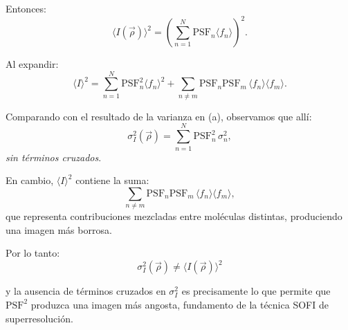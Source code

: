\documentclass[11pt]{article}
\begin{document}
Entonces:
\[
\langle I(\vec{\rho}) \rangle^2
= \left(
\sum_{n=1}^{N}
\text{PSF}_n \langle f_n \rangle
\right)^2.
\]

Al expandir:
\[
\langle I \rangle^2
=
\sum_{n=1}^{N}
\text{PSF}_n^2 \langle f_n \rangle^2
+ \sum_{n \neq m}
\text{PSF}_n \text{PSF}_m\,
\langle f_n \rangle \langle f_m \rangle.
\]

Comparando con el resultado de la varianza en (a), observamos que allí:
\[
\sigma_I^2(\vec{\rho})
= \sum_{n=1}^{N}
\text{PSF}_n^2\,\sigma_n^2,
\]
\emph{sin términos cruzados}.  

En cambio, $\langle I \rangle^2$ contiene la suma:
\[
\sum_{n \neq m}
\text{PSF}_n \text{PSF}_m\,
\langle f_n \rangle \langle f_m \rangle,
\]
que representa contribuciones mezcladas entre moléculas distintas, produciendo una imagen más borrosa.

Por lo tanto:
\[
\sigma_I^2(\vec{\rho}) \neq \langle I(\vec{\rho}) \rangle^2
\]

y la ausencia de términos cruzados en $\sigma_I^2$ es precisamente lo que permite que $\text{PSF}^2$ produzca una imagen más angosta, fundamento de la técnica SOFI de superresolución.
\end{document}
